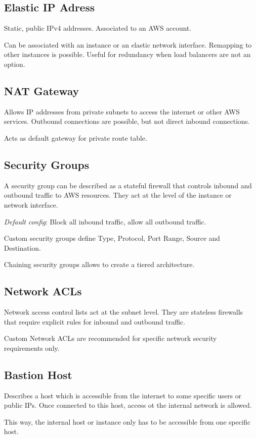 \subsection{Elastic IP Adress}
Static, public IPv4 addresses. Associated to an AWS account.

Can be associated with an instance or an elastic network interface. Remapping to other instances is possible. 
Useful for redundancy when load balancers are not an option.

\subsection{NAT Gateway}
Allows IP addresses from private subnets to access the internet or other AWS services. 
Outbound connections are possible, but not direct inbound connections.

Acts as default gateway for private route table.

\subsection{Security Groups}
A security group can be described as a stateful firewall that controls inbound and outbound traffic to AWS resources.
They act at the level of the instance or network interface.

\emph{Default config}: Block all inbound traffic, allow all outbound traffic. 

Custom security groups define Type, Protocol, Port Range, Source and Destination.

Chaining security groups allows to create a tiered architecture.

\subsection{Network ACLs}
Network access control lists act at the subnet level. 
They are stateless firewalls that require explicit rules for inbound and outbound traffic.

Custom Network ACLs are recommended for specific network security requirements only.

\subsection{Bastion Host}
Describes a host which is accessible from the internet to some specific users or public IPs.
Once connected to this host, access ot the internal network is allowed. 

This way, the internal host or instance only has to be accessible from one specific host.  